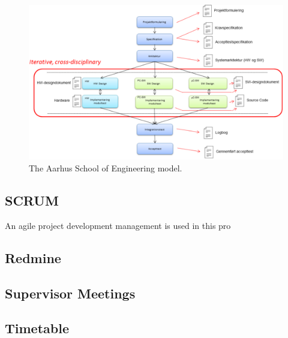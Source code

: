 \begin{figure}[H]
\centering
\includegraphics[scale=0.5]{./pictures/ASEmodel.png}
\caption{The Aarhus School of Engineering model.}
\label{fig:ASEmodel.png}
\end{figure}

\subsection{SCRUM}
An agile project development management is used in this pro


\subsection{Redmine}


\subsection{Supervisor Meetings}


\subsection{Timetable}




